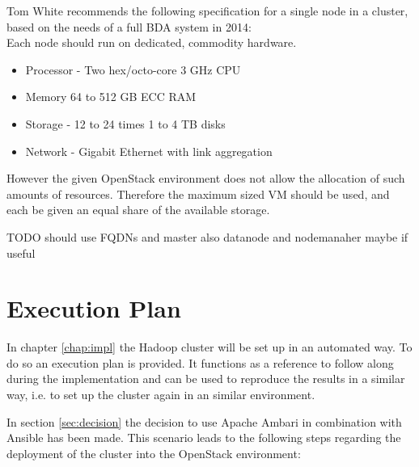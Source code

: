Tom White recommends the following specification for a single node in a cluster, based on the needs of a full \ac{BDA} system in 2014:\\
Each node should run on dedicated, commodity hardware.
\begin{itemize}
    \item Processor - Two hex/octo-core 3 GHz \acs{CPU}
    \item Memory 64 to 512 \ac{GB} \ac{ECC} \ac{RAM}
    \item Storage - 12 to 24 times 1 to 4 \ac{TB} disks
    \item Network - Gigabit Ethernet with link aggregation
\end{itemize}
\autocite{white2015hadoop}

However the given OpenStack environment does not allow the allocation of such amounts of resources. Therefore the maximum sized \acs{VM} should be used, and each be given an equal share of the available storage.

TODO should use \ac{FQDN}s and master also datanode and nodemanaher maybe if useful

\section{Execution Plan}

In chapter \ref{chap:impl} the Hadoop cluster will be set up in an automated way.
To do so an execution plan is provided.
It functions as a reference to follow along during the implementation 
and can be used to reproduce the results in a similar way, i.e. to set up the cluster again in an similar environment.

In section \vref{sec:decision} the decision to use Apache Ambari in combination with Ansible has been made.
This scenario leads to the following steps regarding the deployment of the cluster into the OpenStack environment:

